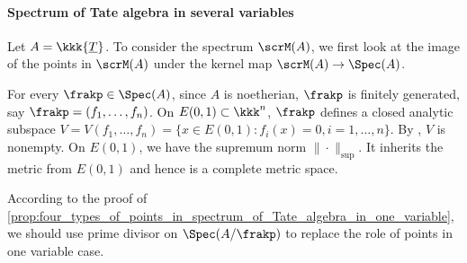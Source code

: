 

    \paragraph{Spectrum of Tate algebra in several variables} 
    Let \(A = \kkk\{\underline{T}\}\).
    To consider the spectrum \(\scrM(A)\), 
    we first look at the image of the points in \(\scrM(A)\) under the kernel map \(\scrM(A) \to \Spec(A)\).
    
    For every \(\frakp \in \Spec(A)\), since \(A\) is noetherian, \(\frakp\) is finitely generated, say \(\frakp = (f_1, \ldots, f_n)\).
    On \(E(0,1) \subset \kkk^n\), \(\frakp\) defines a closed analytic subspace \(V = V(f_1, \ldots, f_n) = \{x \in E(0,1) : f_i(x) = 0, i=1,\ldots,n\}\).
    By , \(V\) is nonempty.
    On \(E(0,1)\), we have the supremum norm \(\|\cdot\|_{\sup}\).
    It inherits the metric from \(E(0,1)\) and hence is a complete metric space.
    
    According to the proof of \cref{prop:four_types_of_points_in_spectrum_of_Tate_algebra_in_one_variable}, 
    we should use prime divisor on \(\Spec(A/\frakp)\) to replace the role of points in one variable case.

